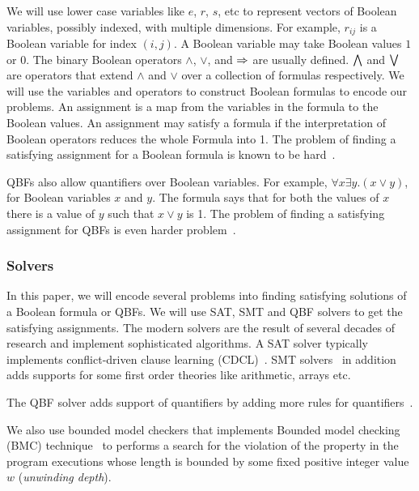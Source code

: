 \noindent We will use lower case variables like $e$, $r$, $s$, etc to represent vectors of
Boolean variables, possibly indexed, with multiple dimensions.
%
For example, $r_{ij}$ is a Boolean variable for index $(i,j)$.
%
%
A Boolean variable may take Boolean values $1$ or $0$.
%
The binary Boolean operators $\land$, $\lor$, and $\Rightarrow$ are usually defined.
%
$\bigwedge$ and $\bigvee$ are operators that extend $\land$ and $\lor$ over a collection of formulas respectively.
%
We will use the variables and operators to construct Boolean formulas to
encode our problems.
%
An assignment is a map from the variables in the formula to the Boolean values.
%
An assignment may satisfy a formula if the interpretation of Boolean operators
reduces the whole Formula into 1.
%
The problem of finding a satisfying assignment for a Boolean formula is known to be hard~\cite{cook1971complexity}.
%

QBFs also allow quantifiers over Boolean variables.
%
For example, $\forall x \exists y. (x \lor y)$, for Boolean variables $x$ and $y$.
%
The formula says that for both the values of $x$ there is a value of $y$
such that $x \lor y$ is 1.
%
The problem of finding a satisfying assignment for QBFs is even harder problem~\cite{savitch1970relationships, stockmeyer1973word}.
%

\subsubsection{Solvers}
In this paper, we will encode several problems into finding satisfying solutions of a Boolean formula or QBFs.
%
We will use SAT, SMT and QBF solvers to get the satisfying assignments.
%
The modern solvers are the result of several decades of research
and implement sophisticated algorithms.
%
%
A SAT solver typically implements conflict-driven clause learning (CDCL)~\cite{biere2009conflict}.
SMT solvers~\cite{nieuwenhuis2006solving, barrett2018satisfiability} in addition adds supports for some first order theories like arithmetic, arrays etc.
% 

The QBF solver adds support of quantifiers by adding more rules for quantifiers~\cite{buning2009theory}.

We also use bounded model checkers that implements Bounded model checking (BMC) technique~\cite{biere1999symbolic1, biere2003bounded} to performs a search for the violation of the property in the program executions whose length is bounded by some fixed positive integer value $w$ (\textit{unwinding depth}). 
%
%

